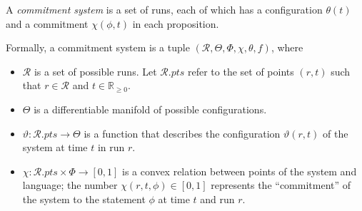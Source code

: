\documentclass{article}
\newcommand\pts[1]{#1.\mathit{pts}}
\newcommand\R{\mathcal R}
\begin{document}
\begin{defn}
    A \emph{commitment system}
    is a set of runs, each of which has a configuration $\theta(t)$ 
    and a commitment $\chi(\phi, t)$ in each proposition.
    
    Formally, a commitment system is a tuple 
    $(\R, \Theta, \Phi, \chi, \theta, f)$,
    where
    \begin{itemize}[]
        \item $\R$ is a set of possible runs.
        Let $\pts \R$ refer to the set of points $(r,t)$ such that $r \in \R$ and $t \in \mathbb R_{\ge 0}$.
        \item $\Theta$ is a differentiable manifold of possible configurations.
        \item $\vartheta : \pts \R \to \Theta$ is a function that                describes the configuration $\vartheta(r,t)$ of the system at time $t$ in run $r$.
        \item
        $\chi: \pts \R \times \Phi \to [0,1]$
        is a convex relation between points of the system and language; 
        the number $\chi(r, t, \phi) \in [0,1]$ represents the ``commitment'' of the system to the statement $\phi$ at time $t$ and run $r$.
        

\end{itemize}
\end{defn}
\end{document}
